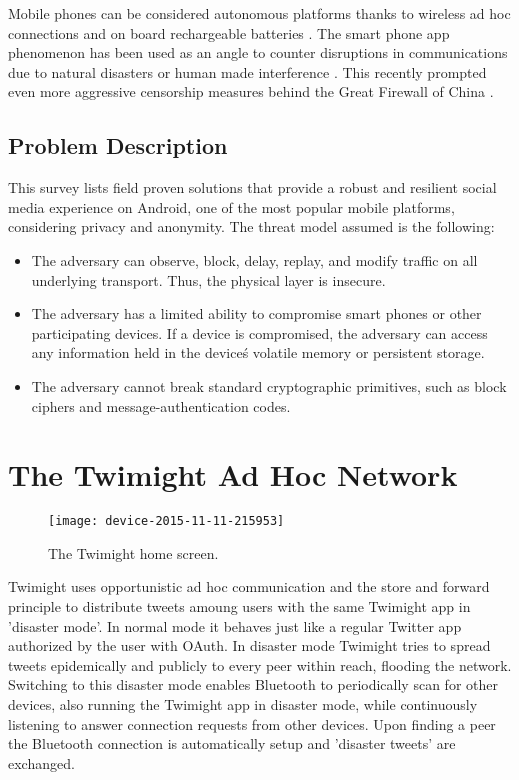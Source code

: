 \documentclass[conference,compsoc]{IEEEtran}
\begin{document}
Mobile phones can be considered autonomous platforms thanks to wireless ad hoc connections and on board rechargeable batteries \cite{quartey2015phone}.
The smart phone app phenomenon has been used as an angle to counter disruptions in communications due to natural disasters or human made interference \cite{brussee2015autonomous}.
This recently prompted even more aggressive censorship measures behind the Great Firewall of China \cite{nyt2015china}.

\subsection*{Problem Description}

This survey lists field proven solutions that provide a robust and resilient social media experience on Android, one of the most popular mobile platforms, considering privacy and anonymity.
The threat model assumed is the following: \cite{pouwelse2012censorshipfree}
\begin{itemize}
\item{The adversary can observe, block, delay, replay, and modify traffic on all underlying transport. Thus, the physical layer is insecure.}
\item{The adversary has a limited ability to compromise smart phones or other participating devices. If a device is compromised, the adversary can access any information held in the device\'s volatile memory or persistent storage.}
\item{The adversary cannot break standard cryptographic primitives, such as block ciphers and message-authentication codes.}
\end{itemize}


\section{The Twimight Ad Hoc Network}

\begin{figure}[b!]
\centering
\texttt{[image: device-2015-11-11-215953]}
\caption{The Twimight home screen.}
\label{fig_twimight}
\end{figure}

Twimight uses opportunistic ad hoc communication and the store and forward principle to distribute tweets amoung users with the same Twimight app in 'disaster mode'.
\cite{Hossmann:2011:TDM:2079360.2079367}
In normal mode it behaves just like a regular Twitter app authorized by the user with OAuth.
In disaster mode Twimight tries to spread tweets epidemically and publicly to every peer within reach, flooding the network.
Switching to this disaster mode enables Bluetooth to periodically scan for other devices, also running the Twimight app in disaster mode, while continuously listening to answer connection requests from other devices.
Upon finding a peer the Bluetooth connection is automatically setup and 'disaster tweets' are exchanged.
\end{document}
